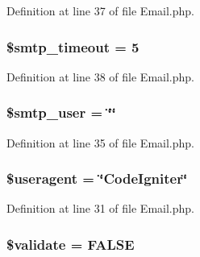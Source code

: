 Definition at line 37 of file Email.\-php.

\hypertarget{class_c_i___email_afd19e9cbfc82dd26a270fccd29e29728}{
\subsubsection[{\$smtp\-\_\-timeout}]{\setlength{\rightskip}{0pt plus 5cm}\$smtp\-\_\-timeout = 5}}\label{class_c_i___email_afd19e9cbfc82dd26a270fccd29e29728}


Definition at line 38 of file Email.\-php.

\hypertarget{class_c_i___email_ac77010332fb55af4ed3ac38f0e39114d}{
\subsubsection[{\$smtp\-\_\-user}]{\setlength{\rightskip}{0pt plus 5cm}\$smtp\-\_\-user = \char`\"{}\char`\"{}}}\label{class_c_i___email_ac77010332fb55af4ed3ac38f0e39114d}


Definition at line 35 of file Email.\-php.

\hypertarget{class_c_i___email_adc6d59b7c0768eeffafe3b78c4836959}{
\subsubsection[{\$useragent}]{\setlength{\rightskip}{0pt plus 5cm}\$useragent = \char`\"{}Code\-Igniter\char`\"{}}}\label{class_c_i___email_adc6d59b7c0768eeffafe3b78c4836959}


Definition at line 31 of file Email.\-php.

\hypertarget{class_c_i___email_a320b75b46e1832c327d9d47b4cea9e7d}{
\subsubsection[{\$validate}]{\setlength{\rightskip}{0pt plus 5cm}\$validate = F\-A\-L\-S\-E}}\label{class_c_i___email_a320b75b46e1832c327d9d47b4cea9e7d}


